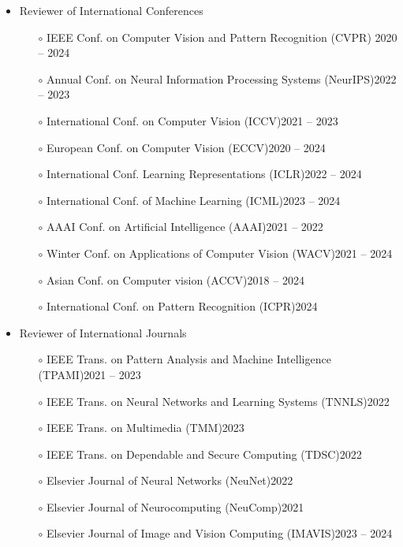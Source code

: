 \documentclass[10pt,margin,line,pifont,palatino,courier]{res}
\begin{document}
\begin{resume}
\begin{itemize}[leftmargin=*]
\item Reviewer of International Conferences
	\begin{itemize}[noitemsep, leftmargin=*]
		\item[$\circ$] IEEE Conf. on Computer Vision and Pattern Recognition (CVPR) \hfill 2020 -- 2024
		\item[$\circ$] Annual Conf. on Neural Information Processing Systems (NeurIPS)\hfill 2022 -- 2023
		\item[$\circ$] International Conf. on Computer Vision (ICCV)\hfill 2021 -- 2023
		\item[$\circ$] European Conf. on Computer Vision (ECCV)\hfill 2020 -- 2024
		\item[$\circ$] International Conf. Learning Representations (ICLR)\hfill 2022 -- 2024
		\item[$\circ$] International Conf. of Machine Learning (ICML)\hfill 2023 -- 2024
		\item[$\circ$] AAAI Conf. on Artificial Intelligence (AAAI)\hfill 2021 -- 2022
		\item[$\circ$] Winter Conf. on Applications of Computer Vision (WACV)\hfill 2021 -- 2024
		\item[$\circ$] Asian Conf. on Computer vision (ACCV)\hfill 2018 -- 2024
        \item[$\circ$] International Conf. on Pattern Recognition (ICPR)\hfill 2024
	\end{itemize}
\item Reviewer of International Journals
	\begin{itemize}[noitemsep, leftmargin=*]
		\item[$\circ$] IEEE Trans. on Pattern Analysis and Machine Intelligence (TPAMI)\hfill 2021 -- 2023
        \item[$\circ$] IEEE Trans. on Neural Networks and Learning Systems (TNNLS)\hfill 2022
        \item[$\circ$] IEEE Trans. on Multimedia (TMM)\hfill 2023
        \item[$\circ$] IEEE Trans. on Dependable and Secure Computing (TDSC)\hfill 2022
        \item[$\circ$] Elsevier Journal of Neural Networks (NeuNet)\hfill 2022
        \item[$\circ$] Elsevier Journal of Neurocomputing (NeuComp)\hfill 2021
        \item[$\circ$] Elsevier Journal of Image and Vision Computing (IMAVIS)\hfill 2023 -- 2024

\end{itemize}
\end{itemize}
\end{resume}
\end{document}
